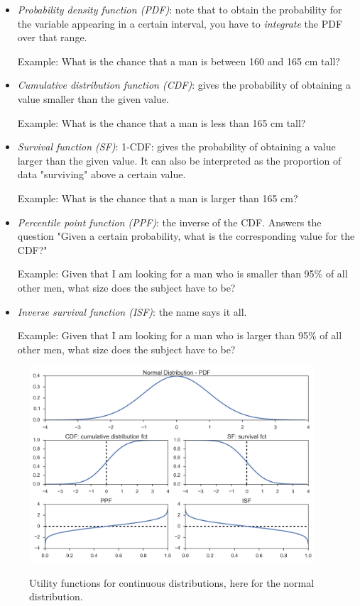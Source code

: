 \begin{itemize}
  \item \emph{Probability density function (PDF)}: note that to obtain the probability for the variable appearing in a certain interval, you have to \emph{integrate} the PDF over that range.

      Example: What is the chance that a man is between 160 and 165 cm tall?

  \item \emph{Cumulative distribution function (CDF)}: gives the probability of obtaining a value smaller than the given value.

        Example: What is the chance that a man is less than 165 cm tall?

  \item \emph{Survival function (SF)}: 1-CDF: gives the probability of obtaining a value larger than the given value. It can also be interpreted as the proportion of data "surviving" above a certain value.

      Example: What is the chance that a man is larger than 165 cm?

  \item \emph{Percentile point function (PPF)}: the inverse of the CDF. Answers the question "Given a certain probability, what is the corresponding value for the CDF?"

    Example: Given that I am looking for a man who is smaller than 95\% of all other men, what size does the subject have to be?

  \item \emph{Inverse survival function (ISF)}: the name says it all.

      Example: Given that I am looking for a man who is larger than 95\% of all other men, what size does the subject have to be?

\end{itemize}

\begin{figure}
  \centering
  \includegraphics[width=0.95\textwidth]{../Images/DistributionFunctions.png}\\
  \caption{Utility functions for continuous distributions, here for the normal distribution.}\label{fig:DistributionUtilities}
\end{figure}

